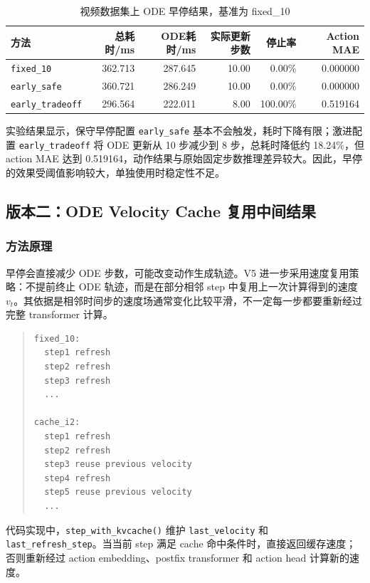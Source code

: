 \documentclass[UTF8,a4paper,12pt]{ctexart}
\begin{document}
\begin{table}[htbp]
\centering
\small
\caption{视频数据集上 ODE 早停结果，基准为 fixed\_10}
\begin{tabular}{lrrrrr}
\toprule
方法 & 总耗时/ms & ODE耗时/ms & 实际更新步数 & 停止率 & Action MAE \\
\midrule
\texttt{fixed\_10} & 362.713 & 287.645 & 10.00 & 0.00\% & 0.000000 \\
\texttt{early\_safe} & 360.721 & 286.249 & 10.00 & 0.00\% & 0.000000 \\
\texttt{early\_tradeoff} & 296.564 & 222.011 & 8.00 & 100.00\% & 0.519164 \\
\bottomrule
\end{tabular}
\end{table}

实验结果显示，保守早停配置 \texttt{early\_safe} 基本不会触发，耗时下降有限；激进配置 \texttt{early\_tradeoff} 将 ODE 更新从 10 步减少到 8 步，总耗时降低约 18.24\%，但 action MAE 达到 0.519164，动作结果与原始固定步数推理差异较大。因此，早停的效果受阈值影响较大，单独使用时稳定性不足。

\subsection{版本二：ODE Velocity Cache 复用中间结果}

\subsubsection{方法原理}

早停会直接减少 ODE 步数，可能改变动作生成轨迹。V5 进一步采用速度复用策略：不提前终止 ODE 轨迹，而是在部分相邻 step 中复用上一次计算得到的速度 \(v_t\)。其依据是相邻时间步的速度场通常变化比较平滑，不一定每一步都要重新经过完整 transformer 计算。

\begin{quote}\small
\begin{verbatim}
fixed_10:
  step1 refresh
  step2 refresh
  step3 refresh
  ...

cache_i2:
  step1 refresh
  step2 refresh
  step3 reuse previous velocity
  step4 refresh
  step5 reuse previous velocity
  ...
\end{verbatim}
\end{quote}

代码实现中，\texttt{step\_with\_kvcache()} 维护 \texttt{last\_velocity} 和 \texttt{last\_refresh\_step}。当当前 step 满足 cache 命中条件时，直接返回缓存速度；否则重新经过 action embedding、postfix transformer 和 action head 计算新的速度。
\end{document}
